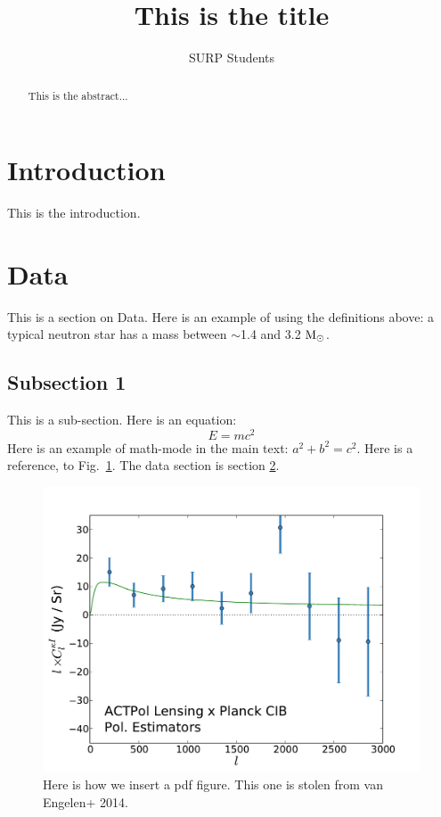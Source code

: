\documentclass[apj]{emulateapj}
\newcommand{\Msol}{${\rm M_{\sun}}$}
\begin{document}
\title{This is the title}
 
\author{SURP Students}
 
\begin{abstract}
This is the abstract...
\end{abstract}





\section{Introduction}
\label{sec:intro}

This is the introduction.


\section{Data}
\label{sec:data}
This is a section on Data. 
Here is an example of using the definitions above: a typical neutron star has a mass between $\sim$1.4 and 3.2 \Msol.


\subsection{Subsection 1}
\label{sec:cmb_data}
This is a sub-section.
Here is an equation:
\begin{equation}
E = mc^2
\label{eq:relativity}
\end{equation}
Here is an example of math-mode in the main text: $a^2 + b^2 = c^2$.  Here is a reference, to Fig.~\ref{fig:figureOfSpectrum}.  The data section is section \ref{sec:data}.


\begin{figure}
\includegraphics[width=1.05\columnwidth]{plotAllPatches_Polonly.pdf}
\caption{Here is how we insert a pdf figure.  This one is stolen from van Engelen+ 2014.\vspace{3mm}}
\label{fig:figureOfSpectrum}
\end{figure}
\end{document}
